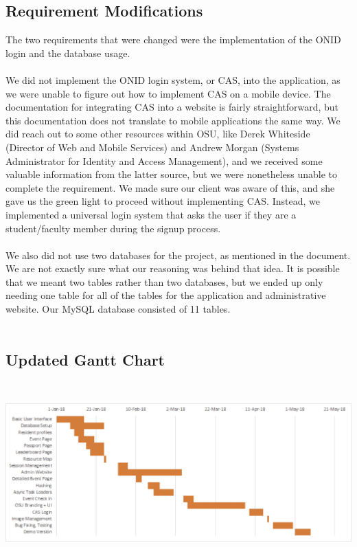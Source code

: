 \documentclass[onecolumn, draftclsnofoot,10pt, compsoc]{IEEEtran}
\begin{document}
  \subsection{Requirement Modifications}
    The two requirements that were changed were the implementation of the ONID login and the database usage. \\ \\
    We did not implement the ONID login system, or CAS, into the application, as we were unable to figure out how to implement CAS on a mobile device. The documentation for integrating CAS into a website is fairly straightforward, but this documentation does not translate to mobile applications the same way. We did reach out to some other resources within OSU, like Derek Whiteside (Director of Web and Mobile Services) and Andrew Morgan (Systems Administrator for Identity and Access Management), and we received some valuable information from the latter source, but we were nonetheless unable to complete the requirement. We made sure our client was aware of this, and she gave us the green light to proceed without implementing CAS. Instead, we implemented a universal login system that asks the user if they are a student/faculty member during the signup process. \\ \\
    We also did not use two databases for the project, as mentioned in the document. We are not exactly sure what our reasoning was behind that idea. It is possible that we meant two tables rather than two databases, but we ended up only needing one table for all of the tables for the application and administrative website. Our MySQL database consisted of 11 tables. \\ \\
  \subsection{Updated Gantt Chart}
    \includegraphics[height=7cm]{ganttchart}
  \newpage
\end{document}
